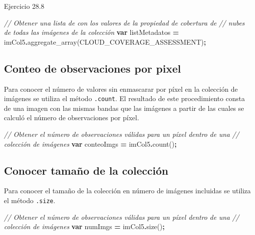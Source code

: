 \documentclass[
  12pt,
  letterpaper,
  twoside]{book}
\newenvironment{Shaded}{\begin{snugshade}}{\end{snugshade}}
\newcommand{\CommentTok}[1]{\textcolor[rgb]{0.56,0.35,0.01}{\textit{#1}}}
\newcommand{\FunctionTok}[1]{\textcolor[rgb]{0.00,0.00,0.00}{#1}}
\newcommand{\KeywordTok}[1]{\textcolor[rgb]{0.13,0.29,0.53}{\textbf{#1}}}
\newcommand{\NormalTok}[1]{#1}
\newcommand{\OperatorTok}[1]{\textcolor[rgb]{0.81,0.36,0.00}{\textbf{#1}}}
\newcommand{\StringTok}[1]{\textcolor[rgb]{0.31,0.60,0.02}{#1}}
\begin{document}
Ejercicio 28.8

\begin{Shaded}
\begin{Highlighting}[]
\CommentTok{// Obtener una lista de con los valores de la propiedad de cobertura de }
\CommentTok{// nubes de todas las imágenes de la colección}
\KeywordTok{var}\NormalTok{ listMetadatos }\OperatorTok{=}\NormalTok{ imCol5}\OperatorTok{.}\FunctionTok{aggregate\_array}\NormalTok{(}\StringTok{\textquotesingle{}CLOUD\_COVERAGE\_ASSESSMENT\textquotesingle{}}\NormalTok{)}\OperatorTok{;}
\end{Highlighting}
\end{Shaded}

\hypertarget{conteo-de-observaciones-por-pixel}{%
\subsection{Conteo de observaciones por pixel}\label{conteo-de-observaciones-por-pixel}}

Para conocer el número de valores sin enmascarar por píxel en la colección de imágenes se utiliza el método \texttt{.count}. El resultado de este procedimiento consta de una imagen con las mismas bandas que las imágenes a partir de las cuales se calculó el número de observaciones por píxel.

\begin{Shaded}
\begin{Highlighting}[]
\CommentTok{// Obtener el número de observaciones válidas para un píxel dentro de una }
\CommentTok{// colección de imágenes}
\KeywordTok{var}\NormalTok{ conteoImgs }\OperatorTok{=}\NormalTok{ imCol5}\OperatorTok{.}\FunctionTok{count}\NormalTok{()}\OperatorTok{;}
\end{Highlighting}
\end{Shaded}

\hypertarget{conocer-tamauxf1o-de-la-colecciuxf3n}{%
\subsection{Conocer tamaño de la colección}\label{conocer-tamauxf1o-de-la-colecciuxf3n}}

Para conocer el tamaño de la colección en número de imágenes incluidas se utiliza el método \texttt{.size}.

\begin{Shaded}
\begin{Highlighting}[]
\CommentTok{// Obtener el número de observaciones válidas para un píxel dentro de una }
\CommentTok{// colección de imágenes}
\KeywordTok{var}\NormalTok{ numImgs }\OperatorTok{=}\NormalTok{ imCol5}\OperatorTok{.}\FunctionTok{size}\NormalTok{()}\OperatorTok{;}
\end{Highlighting}
\end{Shaded}
\end{document}

